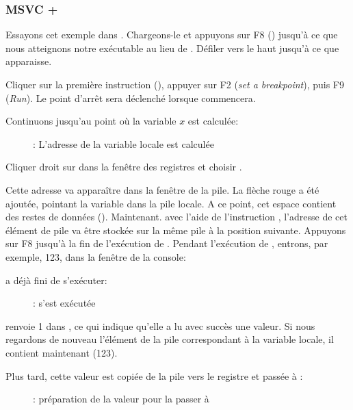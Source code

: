 \clearpage
\subsubsection{MSVC + \olly}
\myindex{\olly}

Essayons cet exemple dans \olly.
Chargeons-le et appuyons sur F8 (\stepover) jusqu'à ce que nous atteignons notre
exécutable au lieu de .
Défiler vers le haut jusqu'à ce que \main apparaisse.

Cliquer sur la première instruction  (), appuyer sur F2 (\emph{set a
breakpoint}), puis F9 (\emph{Run}).
Le point d'arrêt sera déclenché lorsque \main commencera.

Continuons jusqu'au point où la variable $x$ est calculée:

\begin{figure}[H]
\centering
{}
\caption{\olly: L'adresse de la variable locale est calculée}
\label{fig:scanf_ex1_olly_1}
\end{figure}

Cliquer droit sur \EAX dans la fenêtre des registres et choisir .

Cette adresse va apparaître dans la fenêtre de la pile.
La flèche rouge a été ajoutée, pointant la variable dans la pile locale.
A ce point, cet espace contient des restes de données ().
Maintenant. avec l'aide de l'instruction \PUSH, l'adresse de cet élément de pile
va être stockée sur la même pile à la position suivante.
Appuyons sur F8 jusqu'à la fin de l'exécution de \scanf.
Pendant l'exécution de \scanf, entrons, par exemple, 123, dans la fenêtre de la console:



\clearpage
\scanf a déjà fini de s'exécuter:

\begin{figure}[H]
\centering
{}
\caption{\olly: \scanf s'est exécutée}
\label{fig:scanf_ex1_olly_3}
\end{figure}

\scanf renvoie 1 dans \EAX, ce qui indique qu'elle a lu avec succès une valeur.
Si nous regardons de nouveau l'élément de la pile correspondant à la variable
locale, il contient maintenant  (123).

\clearpage

Plus tard, cette valeur est copiée de la pile vers le registre \ECX et passée à \printf:

\begin{figure}[H]
\centering
{}
\caption{\olly: préparation de la valeur pour la passer à \printf}
\label{fig:scanf_ex1_olly_4}
\end{figure}

